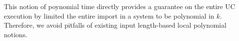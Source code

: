 This notion of poynomial time directly provides a guarantee on the entire UC execution by limited the entire import in a system to be polynomial in $k$. Therefore, we avoid pitfalls of existing input length-based local polynomial notions.

%
%
%





